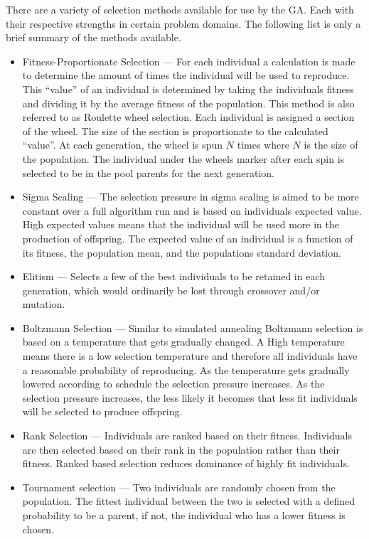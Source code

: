 There are a variety of selection methods available for use by the \gls{GA}. Each with their respective strengths in certain problem domains. The following list is only a brief summary of the methods available.
\begin{itemize}
    \item{Fitness-Proportionate Selection} --- For each individual a calculation is made to determine the amount of times the individual will be used to reproduce. This ``value'' of an individual is determined by taking the individuals fitness and dividing it by the average fitness of the population. This method is also referred to as Roulette wheel selection. Each individual is assigned a section of the wheel. The size of the section is proportionate to the calculated ``value''. At each generation, the wheel is spun $N$ times where $N$ is the size of the population. The individual under the wheels marker after each spin is selected to be in the pool parents for the next generation\cite{IntroToGAs}.
    \item{Sigma Scaling} --- The selection pressure in sigma scaling is aimed to be more constant over a full algorithm run and is based on individuals expected value. High expected values means that the individual will be used more in the production of offspring. The expected value of an individual is a function of its fitness, the population mean, and the populations standard deviation\cite{IntroToGAs}.
    \item{Elitism} --- Selects a few of the best individuals to be retained in each generation, which would ordinarily be lost through crossover and/or mutation.
    \item{Boltzmann Selection} --- Similar to simulated annealing Boltzmann selection is based on a temperature that gets gradually changed. A High temperature means there is a low selection temperature and therefore all individuals have a reasonable probability of reproducing. As the temperature gets gradually lowered according to schedule the selection pressure increases. As the selection pressure increases, the less likely it becomes that less fit individuals will be selected to produce offspring\cite{IntroToGAs}.
    \item{Rank Selection} --- Individuals are ranked based on their fitness. Individuals are then selected based on their rank in the population rather than their fitness.  Ranked based selection reduces dominance of highly fit individuals\cite{IntroToGAs}.
    \item{Tournament selection} --- Two individuals are randomly chosen from the population. The fittest individual between the two is selected with a defined probability to be a parent, if not, the individual who has a lower fitness is chosen\cite{IntroToGAs}.
\end{itemize}

